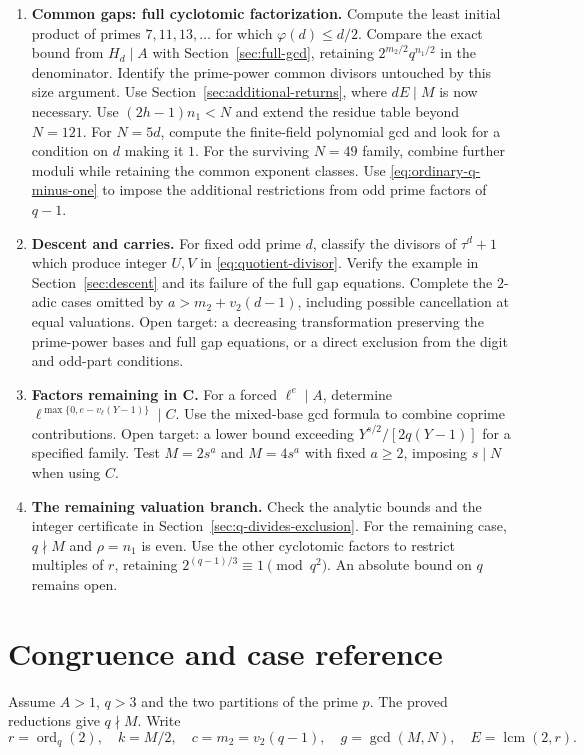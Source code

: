 \documentclass[11pt]{article}
\begin{document}
\begin{enumerate}
\item \textbf{Common gaps: full cyclotomic factorization.}
Compute the least initial product of primes $7,11,13,\ldots$ for which
$\varphi(d)\leq d/2$. Compare the exact bound from $H_d\mid A$ with
Section~\ref{sec:full-gcd}, retaining $2^{m_2/2}q^{n_1/2}$ in the
denominator. Identify the prime-power common divisors untouched by
this size argument.
Use Section~\ref{sec:additional-returns}, where $dE\mid M$ is now
necessary. Use $(2h-1)n_1<N$ and extend the residue table beyond
$N=121$. For $N=5d$, compute the finite-field polynomial gcd and
look for a condition on $d$ making it $1$. For the surviving
$N=49$ family, combine further moduli while retaining the common
exponent classes. Use \eqref{eq:ordinary-q-minus-one} to impose
the additional restrictions from odd prime factors of $q-1$.

\item \textbf{Descent and carries.}
For fixed odd prime $d$, classify the divisors of $\tau^d+1$ which
produce integer $U,V$ in \eqref{eq:quotient-divisor}. Verify the example
in Section~\ref{sec:descent} and its failure of the full gap equations.
Complete the $2$-adic cases omitted by $a>m_2+v_2(d-1)$, including
possible cancellation at equal valuations. Open target: a decreasing
transformation preserving the prime-power bases and full gap equations,
or a direct exclusion from the digit and odd-part conditions.

\item \textbf{Factors remaining in C.}
For a forced $\ell^e\mid A$, determine
$\ell^{\max\{0,e-v_\ell(Y-1)\}}\mid C$.
Use the mixed-base gcd formula to combine coprime contributions.
Open target: a lower bound exceeding $Y^{s/2}/[2q(Y-1)]$ for a
specified family. Test $M=2s^a$ and $M=4s^a$ with fixed $a\geq2$,
imposing $s\mid N$ when using $C$.

\item \textbf{The remaining valuation branch.}
Check the analytic bounds and the integer certificate in
Section~\ref{sec:q-divides-exclusion}. For the remaining case,
$q\nmid M$ and $\rho=n_1$ is even. Use the other cyclotomic factors
to restrict multiples of $r$, retaining
$2^{(q-1)/3}\equiv1\pmod{q^2}$. An absolute bound on $q$ remains open.
\end{enumerate}

\appendix
\clearpage
\section{Congruence and case reference}
\label{sec:reference-tables}
Assume $A>1$, $q>3$ and the two partitions of the prime $p$.
The proved reductions give $q\nmid M$. Write
\[
r=\operatorname{ord}_q(2),\quad k=M/2,\quad
c=m_2=v_2(q-1),\quad g=\gcd(M,N),\quad E=\operatorname{lcm}(2,r).
\]
\end{document}
